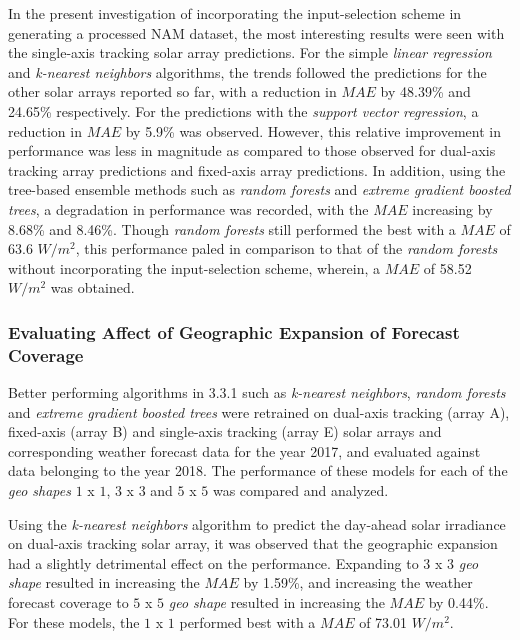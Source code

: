 \par In the present investigation of incorporating the input-selection scheme in generating a processed NAM dataset, the most interesting results were seen with the single-axis tracking solar array predictions. For the simple \textit{linear regression} and \textit{k-nearest neighbors} algorithms, the trends followed the predictions for the other solar arrays reported so far, with a reduction in $MAE$ by 48.39\% and 24.65\% respectively. For the predictions with the \textit{support vector regression}, a reduction in $MAE$ by 5.9\% was observed. However, this relative improvement in performance was less in magnitude as compared to those observed for dual-axis tracking array predictions and fixed-axis array predictions. In addition, using the tree-based ensemble methods such as \textit{random forests} and \textit{extreme gradient boosted trees}, a degradation in performance was recorded, with the $MAE$ increasing by 8.68\% and 8.46\%. Though \textit{random forests} still performed the best with a $MAE$ of 63.6 $W/m^2$, this performance paled in comparison to that of the \textit{random forests} without incorporating the input-selection scheme, wherein, a $MAE$ of 58.52 $W/m^2$ was obtained.

\subsubsection*{Evaluating Affect of Geographic Expansion of Forecast Coverage}
\par Better performing algorithms in 3.3.1 such as \textit{k-nearest neighbors}, \textit{random forests} and \textit{extreme gradient boosted trees} were retrained on dual-axis tracking (array A), fixed-axis (array B) and single-axis tracking (array E) solar arrays and corresponding weather forecast data for the year 2017, and evaluated against data belonging to the year 2018. The performance of these models for each of the \textit{geo shapes} $1$ x $1$, $3$ x $3$ and $5$ x $5$ was compared and analyzed.

\par Using the \textit{k-nearest neighbors} algorithm to predict the day-ahead solar irradiance on dual-axis tracking solar array, it was observed that the geographic expansion had a slightly detrimental effect on the performance. Expanding to $3$ x $3$ \textit{geo shape} resulted in increasing the $MAE$ by 1.59\%, and increasing the weather forecast coverage to $5$ x $5$ \textit{geo shape} resulted in increasing the $MAE$ by 0.44\%. For these models, the $1$ x $1$ performed best with a $MAE$ of 73.01 $W/m^2$.

